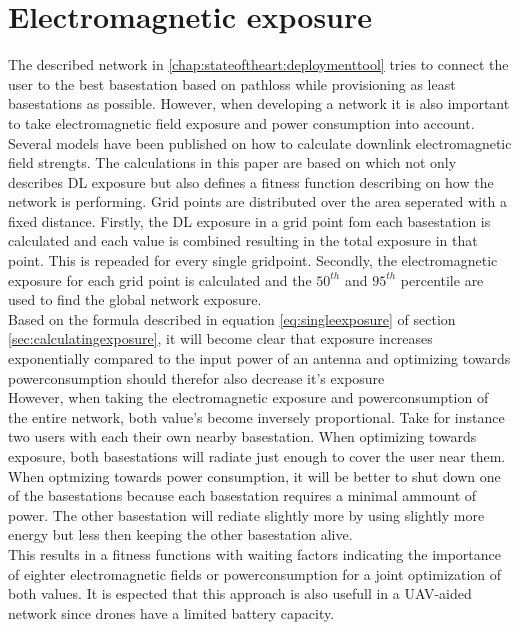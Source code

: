\section{Electromagnetic exposure}
\label{chap:capbaseddeploymenttool}

The described network in \ref{chap:stateoftheart:deploymenttool} tries to connect the user to the best basestation based on pathloss while provisioning as least basestations as possible.
However, when developing a network it is also important to take electromagnetic field exposure and power consumption into account. Several models have been published on how to calculate downlink electromagnetic field strengts. 
The calculations in this paper are based on \cite{J1} which not only describes \gls{DL} exposure but also defines a fitness function describing on how the network is performing. 
Grid points are distributed over the area seperated with a fixed distance. Firstly, the \gls{DL} exposure in a grid point fom each basestation is calculated and each value is combined resulting
in the total exposure in that point. This is repeaded for every single gridpoint.
Secondly, the electromagnetic exposure for each grid point is calculated and the $50^{th}$ and $95^{th}$ percentile are used to find the global network exposure. \\

Based on the formula described in equation \ref{eq:singleexposure} of section \ref{sec:calculatingexposure}, it will become clear that exposure increases exponentially compared to the input power
of an antenna and optimizing towards powerconsumption should therefor also decrease it's exposure\\

However, when taking the electromagnetic exposure and powerconsumption of the entire network, both value's become inversely proportional. Take for instance two users with each their own nearby basestation.
When optimizing towards exposure, both basestations will radiate just enough to cover the user near them. When optmizing towards power consumption, it will be better to shut down one of the basestations because
each basestation requires a minimal ammount of power. The other basestation will rediate slightly more by using slightly more energy but less then keeping the other basestation alive. \\

This results in a fitness functions with waiting factors indicating the importance of eighter electromagnetic fields or powerconsumption for a joint optimization of both values.
It is espected that this approach is also usefull in a UAV-aided network since drones have a limited battery capacity. \\


